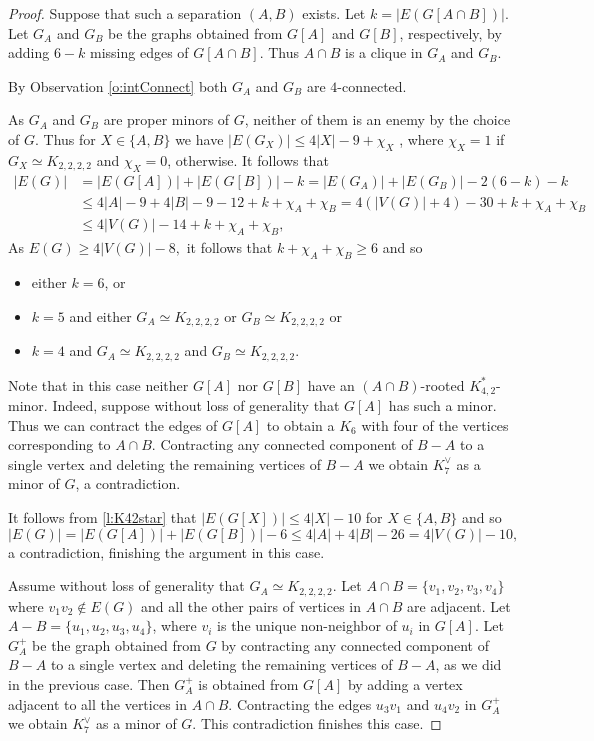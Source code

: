 \documentclass[reqno,final,12pt]{amsart}
\begin{document}
{	\begin{proof} Suppose that such a separation $(A,B)$ exists. Let $k=|E(G[A \cap B])|$. Let $G_A$ and $G_B$ be the graphs obtained from $G[A]$ and $G[B]$, respectively, by adding $6-k$ missing edges of $G[A \cap B]$. Thus $A \cap B$ is a clique in $G_A$ and $G_B$.

By Observation \ref{o:intConnect} both $G_A$ and $G_B$ are $4$-connected. 	
		
As $G_A$ and $G_B$ are proper minors of $G$, neither of them is an enemy by the choice of $G$. 	Thus for $X \in \{A,B\}$ we have $|E(G_X)| \leq 4|X| - 9+\chi_X$ , where  $\chi_X =1$ if $G_X \simeq K_{2,2,2,2}$  and $\chi_X=0$, otherwise.
It follows that   \begin{align*}
	|E(G)| &= |E(G[A])| + |E(G[B])| -k = |E(G_A)|+|E(G_B)| -2(6-k)-k \\
	&\leq 4|A| - 9  + 4|B| - 9 - 12 + k + \chi_A +\chi_B 
	= 4(|V(G)| + 4) - 30 + k  + \chi_A +\chi_B \\
	&\leq 4|V(G)| - 14 + k  + \chi_A +\chi_B,
\end{align*} 
As $E(G) \geq  4|V(G)| - 8,$ it follows that $k+\chi_A +\chi_B \geq 6$ and so \begin{itemize} \item either $k = 6$, or \item $k=5$ and either  $G_A \simeq K_{2,2,2,2}$ or $G_B \simeq K_{2,2,2,2}$
 or \item $k=4$ and  $G_A \simeq K_{2,2,2,2}$ and $G_B \simeq K_{2,2,2,2}$.
 \end{itemize}
 Note that in this case neither $G[A]$ nor $G[B]$ have an $(A \cap B)$-rooted $K^*_{4,2}$-minor.
 Indeed, suppose without loss of generality that $G[A]$ has such a minor. Thus we can contract the edges of $G[A]$ to obtain a $K_6$ with four of the vertices corresponding to $A \cap B$.  Contracting any connected component of $B-A$ to a single vertex and deleting the remaining vertices of $B-A$ we obtain $K_7^{\vee}$ as a minor of $G$, a contradiction.
 
  It follows from \cref{l:K42star} that $|E(G[X])| \leq 4|X|- 10$ for $X \in \{A,B\}$ and so $$
  	|E(G)| = |E(G[A])| + |E(G[B])| -6 
  	\leq 4|A|  + 4|B| - 26 
  = 4|V(G)| - 10,
$$
a contradiction, finishing the argument in this case.

\vskip 5pt 
 Assume without loss of generality that    $G_A \simeq K_{2,2,2,2}$. Let $A \cap B = \{v_1,v_2,v_3,v_4\}$ where $v_1v_2 \not \in E(G)$ and all the other pairs of vertices in $A \cap B$ are adjacent. Let $A - B = \{u_1,u_2,u_3,u_4\}$, where $v_i$ is the unique non-neighbor of $u_i$ in $G[A]$. Let $G^{+}_A$ be the graph obtained from $G$ by contracting any connected component of $B-A$ to a single vertex and deleting the remaining vertices of $B-A$, as we did in the previous case. Then $G^{+}_A$ is obtained from $G[A]$ by adding a vertex adjacent to all the vertices in  $A \cap B$. Contracting the edges $u_3v_1$ and $u_4v_2$ in $G^{+}_A$ we obtain $K_7^{\vee}$ as a minor of $G$. This contradiction finishes this case.
 

\end{proof}}
\end{document}
